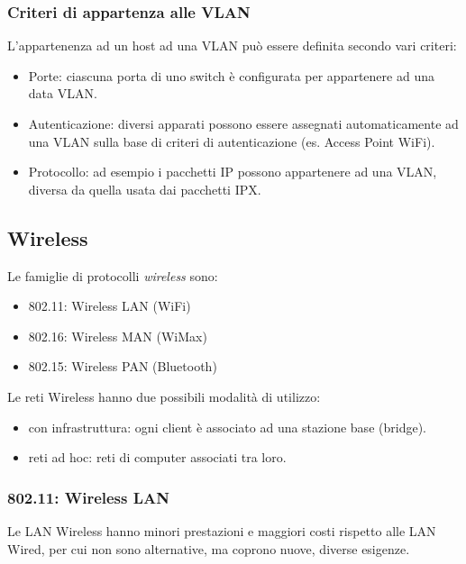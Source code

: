         \subsubsection{Criteri di appartenza alle VLAN}
            L'appartenenza ad un host ad una VLAN può essere definita secondo vari criteri:
            \begin{itemize}
                \item Porte: ciascuna porta di uno switch è configurata per appartenere ad una data VLAN.
                \item Autenticazione: diversi apparati possono essere assegnati automaticamente ad una VLAN sulla base di criteri di autenticazione (es. Access Point WiFi).
                \item Protocollo: ad esempio i pacchetti IP possono appartenere ad una VLAN, diversa da quella usata dai pacchetti IPX.
            \end{itemize}

    \subsection{Wireless}
        Le famiglie di protocolli \textit{wireless} sono:
            \begin{itemize}
                \item 802.11: Wireless LAN (WiFi)
                \item 802.16: Wireless MAN (WiMax)
                \item 802.15: Wireless PAN (Bluetooth)
            \end{itemize}

        Le reti Wireless hanno due possibili modalità di utilizzo:
        \begin{itemize}
            \item con infrastruttura: ogni client è associato ad una stazione base (bridge).
            \item reti ad hoc: reti di computer associati tra loro.
        \end{itemize}

        \subsubsection{802.11: Wireless LAN}
            Le LAN Wireless hanno minori prestazioni e maggiori costi rispetto alle LAN Wired, per cui non sono alternative, ma coprono nuove, diverse esigenze.
        
